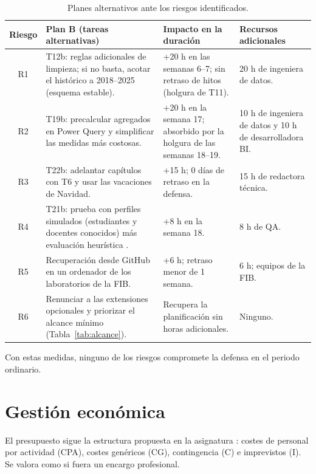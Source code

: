 \documentclass[12pt, a4paper, oneside]{report}
\begin{document}
\begin{table}[H]
\centering
\small
\renewcommand{\arraystretch}{1.1}
\setlength{\tabcolsep}{3pt}
\begin{tabularx}{\textwidth}{@{} c X p{3.2cm} p{2.8cm} @{}}
\toprule
\textbf{Riesgo} & \textbf{Plan B (tareas alternativas)} & \textbf{Impacto en la duración} & \textbf{Recursos adicionales} \\ \midrule
R1 & T12b: reglas adicionales de limpieza; si no basta, acotar el histórico a 2018--2025 (esquema estable). & +20 h en las semanas 6--7; sin retraso de hitos (holgura de T11). & 20 h de ingeniera de datos. \\ \addlinespace
R2 & T19b: precalcular agregados en Power Query y simplificar las medidas más costosas. & +20 h en la semana 17; absorbido por la holgura de las semanas 18--19. & 10 h de ingeniera de datos y 10 h de desarrolladora BI. \\ \addlinespace
R3 & T22b: adelantar capítulos con T6 y usar las vacaciones de Navidad. & +15 h; 0 días de retraso en la defensa. & 15 h de redactora técnica. \\ \addlinespace
R4 & T21b: prueba con perfiles simulados (estudiantes y docentes conocidos) más evaluación heurística \cite{nielsen1993usability}. & +8 h en la semana 18. & 8 h de QA. \\ \addlinespace
R5 & Recuperación desde GitHub en un ordenador de los laboratorios de la FIB. & +6 h; retraso menor de 1 semana. & 6 h; equipos de la FIB. \\ \addlinespace
R6 & Renunciar a las extensiones opcionales y priorizar el alcance mínimo (Tabla~\ref{tab:alcance}). & Recupera la planificación sin horas adicionales. & Ninguno. \\ \bottomrule
\end{tabularx}
\caption{Planes alternativos ante los riesgos identificados.}
\label{tab:planesB}
\end{table}

Con estas medidas, ninguno de los riesgos compromete la defensa en el periodo ordinario.

\chapter{Gestión económica}
El presupuesto sigue la estructura propuesta en la asignatura \cite{fib_costos}: costes de personal por actividad (CPA), costes genéricos (CG), contingencia (C) e imprevistos (I). Se valora como si fuera un encargo profesional.
\end{document}
